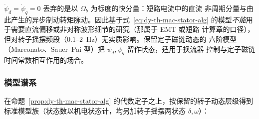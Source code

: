 \begin{remark}[定子暂态忽略的代价]\label{rem:dy-th-mac-statorneglect}
$\dot\psi_d=\dot\psi_q=0$ 丢弃的是以 $\Omega_b$ 为标度的快分量：短路电流中的直流
非周期分量与由此产生的异步制动转矩脉动。因此基于式~\eqref{eq:dy-th-mac-stator-alg}
的模型\emph{不能}用于需要直流偏移或非对称波形细节的研究（那属于 EMT 或短路
计算章的口径），但对转子摇摆频段（$0.1$–$2$~Hz）无实质影响。保留定子磁链动态的
六阶模型（Marconato、Sauer--Pai 型）把 $\psi_d,\psi_q$ 留作状态，适用于换流器
控制与定子磁链时间常数相互作用的场合。
\end{remark}

\subsubsection{模型谱系}

在命题~\ref{prop:dy-th-mac-stator-alg} 的代数定子之上，按保留的转子动态层级得到
标准模型族（状态数以机电状态计，均另加转子摇摆两状态 $\delta,\omega$）：

